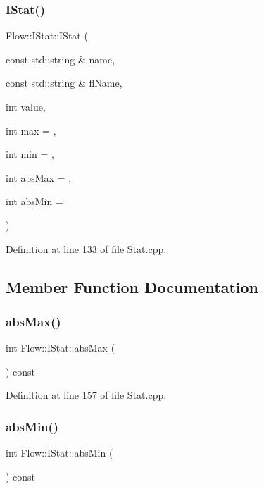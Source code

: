\subsubsection{\texorpdfstring{I\+Stat()}{IStat()}\hspace{0.1cm}{\footnotesize\ttfamily [3/3]}}
{\footnotesize\ttfamily Flow\+::\+I\+Stat\+::\+I\+Stat (\begin{DoxyParamCaption}\item[{const std\+::string \&}]{name,  }\item[{const std\+::string \&}]{fl\+Name,  }\item[{int}]{value,  }\item[{int}]{max = {},  }\item[{int}]{min = {},  }\item[{int}]{abs\+Max = {},  }\item[{int}]{abs\+Min = {} }\end{DoxyParamCaption})}



Definition at line 133 of file Stat.\+cpp.



\subsection{Member Function Documentation}
\hypertarget{class_flow_1_1_i_stat_a4dcf3ab54ecddbdae7ccdfb86178109f}{}\label{class_flow_1_1_i_stat_a4dcf3ab54ecddbdae7ccdfb86178109f} 
\subsubsection{\texorpdfstring{abs\+Max()}{absMax()}}
{\footnotesize\ttfamily int Flow\+::\+I\+Stat\+::abs\+Max (\begin{DoxyParamCaption}{ }\end{DoxyParamCaption}) const}



Definition at line 157 of file Stat.\+cpp.

\hypertarget{class_flow_1_1_i_stat_a19c20be8f2389371480f2cd07066d387}{}\label{class_flow_1_1_i_stat_a19c20be8f2389371480f2cd07066d387} 
\subsubsection{\texorpdfstring{abs\+Min()}{absMin()}}
{\footnotesize\ttfamily int Flow\+::\+I\+Stat\+::abs\+Min (\begin{DoxyParamCaption}{ }\end{DoxyParamCaption}) const}



